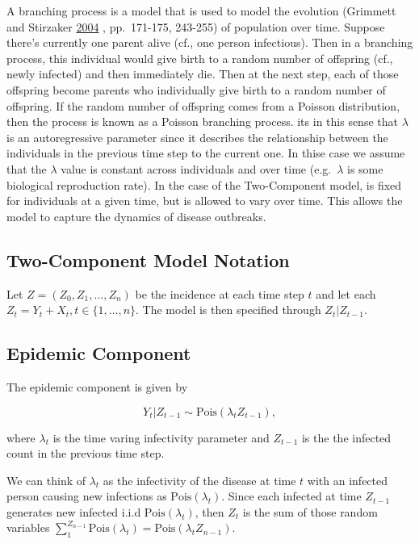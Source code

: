 \documentclass[11pt,a4paper]{article}
\numberwithin{equation}{section}
\begin{document}
A branching process is a model that is used to model the evolution
(Grimmett and Stirzaker
\protect\hyperlink{ref-grimmett_probability_2004}{2004} , pp.~171-175,
243-255) of population over time. Suppose there's currently one parent
alive (cf., one person infectious). Then in a branching process, this
individual would give birth to a random number of offspring (cf., newly
infected) and then immediately die. Then at the next step, each of those
offspring become parents who individually give birth to a random number
of offspring. If the random number of offspring comes from a Poisson
distribution, then the process is known as a Poisson branching process.
its in this sense that \(\lambda\) is an autoregressive parameter since
it describes the relationship between the individuals in the previous
time step to the current one. In thise case we assume that the
\(\lambda\) value is constant across individuals and over time
(e.g.~\(\lambda\) is some biological reproduction rate). In the case of
the Two-Component model, is fixed for individuals at a given time, but
is allowed to vary over time. This allows the model to capture the
dynamics of disease outbreaks.

\hypertarget{two-component-model-notation}{%
\subsection{Two-Component Model
Notation}\label{two-component-model-notation}}

Let \(Z = (Z_0, Z_1, ..., Z_n)\) be the incidence at each time step
\(t\) and let each \(Z_t= Y_t + X_t, t\in \{1,\dots, n\}\). The model is
then specified through \(Z_t | Z_{t-1}\).

\hypertarget{epidemic-component}{%
\subsection{Epidemic Component}\label{epidemic-component}}

The epidemic component is given by

\[Y_t|Z_{t-1} \sim\text{Pois}(\lambda_tZ_{t-1}),\]

where \(\lambda_t\) is the time varing infectivity parameter and
\(Z_{t-1}\) is the the infected count in the previous time step.

We can think of \(\lambda_t\) as the infectivity of the disease at time
\(t\) with an infected person causing new infections as
\(\text{Pois}(\lambda_t)\). Since each infected at time \(Z_{t-1}\)
generates new infected i.i.d \(\text{Pois}(\lambda_t)\), then \(Z_t\) is
the sum of those random variables 
\(\sum_1^{Z_{n-1}}\text{Pois}(\lambda_t) =\text{Pois}(\lambda_tZ_{n-1})\).
\end{document}
